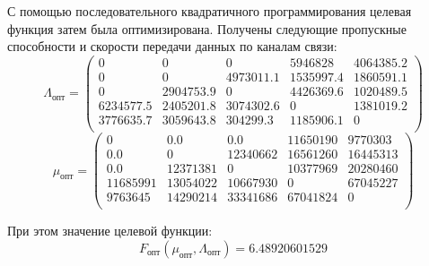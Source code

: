 \documentclass[14pt,a4paper,titlepage]{extarticle}
\begin{document}
С помощью последовательного квадратичного программирования целевая функция затем была оптимизирована. Получены следующие пропускные способности и скорости передачи данных по каналам связи:
\begin{equation}
\Lambda_{\text{опт}} = 
\begin{pmatrix}
0 & 0 & 0 & 5946828 & 4064385.2 \\ 
0 & 0 & 4973011.1 & 1535997.4 & 1860591.1 \\ 
0 & 2904753.9 & 0 & 4426369.6 & 1020489.5 \\
6234577.5 & 2405201.8 & 3074302.6 & 0 & 1381019.2 \\ 
3776635.7 & 3059643.8 & 304299.3 & 1185906.1 & 0 \\
\end{pmatrix}
\end{equation}
\begin{equation}
\mu_{\text{опт}} = 
\begin{pmatrix}
0 & 0.0 & 0.0 & 11650190 & 9770303\\ 
0.0 & 0 & 12340662 & 16561260 & 16445313\\
0.0 & 12371381 & 0 & 10377969 & 20280460\\
11685991 & 13054022 & 10667930 & 0 & 67045227\\ 
9763645 & 14290214 & 33341686 & 67041824 & 0\\
\end{pmatrix}
\end{equation}

При этом значение целевой функции:
\begin{equation}
F_{\text{опт}}(\mu_{\text{опт}}, \Lambda_{\text{опт}}) = 6.48920601529
\end{equation}
\end{document}
